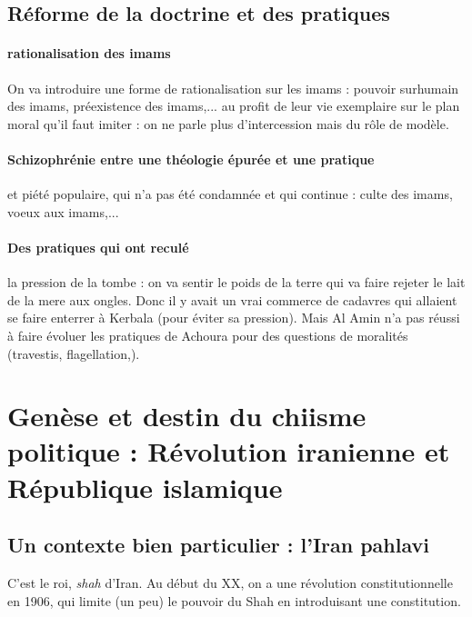     \subsection{Réforme de la doctrine et des pratiques}

\paragraph{rationalisation des imams}  On va introduire une forme de rationalisation sur les imams : pouvoir surhumain des imams, préexistence des imams,...
  au profit de leur vie exemplaire sur le plan moral qu'il faut imiter : on ne parle plus d'intercession mais du rôle de modèle.
  
 \paragraph{Schizophrénie entre une théologie épurée et une pratique } et piété populaire, qui n'a pas été condamnée et qui continue : culte des imams, voeux aux imams,...
 
 \paragraph{Des pratiques qui ont reculé} la pression de la tombe : on va sentir le poids de la terre qui va faire rejeter le lait de la mere aux ongles. Donc il y avait un vrai commerce de cadavres qui allaient se faire enterrer à Kerbala (pour éviter sa pression).
 Mais Al Amin n'a pas réussi à faire évoluer les pratiques de Achoura pour des questions de moralités (travestis, flagellation,). 
 

\section{Genèse et destin du chiisme politique : Révolution iranienne et République islamique}
\label{genuxe8se-et-destin-du-chiisme-politique-ruxe9volution-iranienne-et-ruxe9publique-islamique}


 
 
 
   \subsection{Un contexte bien particulier : l'Iran pahlavi}
    
    C'est le roi, \textit{shah} d'Iran. Au début du XX, on a une révolution constitutionnelle en 1906, qui limite (un peu) le pouvoir du Shah en introduisant une constitution.
    
